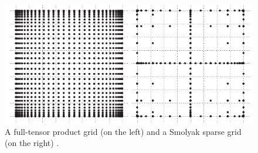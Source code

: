 \begin{figure}
  \centering
  \includegraphics[width=0.9\linewidth]{include/assets/integration-grids.pdf}
  \vspace{-1.0em}
  \caption{A full-tensor product grid (on the left) and a Smolyak sparse grid (on the right) \cite{eldred2008}.}
  \vspace{-1.5em}
\end{figure}
